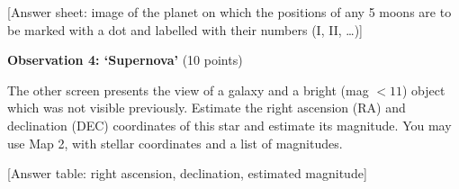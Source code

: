 [Answer sheet: image of the planet on which the positions of any 5 moons are
to be marked with a dot and labelled with their numbers (I, II, \ldots)]

\medskip
\textbf{Observation 4: `Supernova'} (10 points)

The other screen presents the view of a galaxy and a bright (mag $< 11$)
object which was not visible previously. Estimate the right ascension (RA)
and declination (DEC) coordinates of this star and estimate its magnitude.
You may use Map 2, with stellar coordinates and a list of magnitudes.

[Answer table: right ascension, declination, estimated magnitude]

